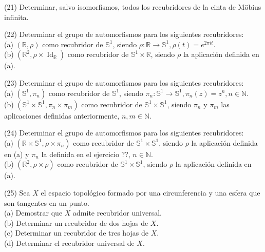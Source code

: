\documentclass[
  a4paper,
  spanish,
  12pt,
]{scrartcl}
\begin{document}
\begin{ejer}
(21) Determinar, salvo isomorfismos, todos los recubridores de la cinta de Möbius infinita.\\
\end{ejer}

\begin{ejer}
(22) Determinar el grupo de automorfismos para los siguientes recubridores:\\
(a) $(\mathbb{R}, \rho)$ como recubridor de $\mathbb{S}^{1}$, siendo $\rho: \mathbb{R} \rightarrow \mathbb{S}^{1}, \rho(t)=e^{2 \pi i t}$.\\
(b) $\left(\mathbb{R}^{2}, \rho \times \operatorname{Id}_{\mathbb{R}}\right)$ como recubridor de $\mathbb{S}^{1} \times \mathbb{R}$, siendo $\rho$ la aplicación definida en (a).\\
\end{ejer}

\begin{ejer}
(23) Determinar el grupo de automorfismos para los siguientes recubridores:\\
(a) $\left(\mathbb{S}^{1}, \pi_{n}\right)$ como recubridor de $\mathbb{S}^{1}$, siendo $\pi_{n}: \mathbb{S}^{1} \rightarrow \mathbb{S}^{1}, \pi_{n}(z)=z^{n}, n \in \mathbb{N}$.\\
(b) $\left(\mathbb{S}^{1} \times \mathbb{S}^{1}, \pi_{n} \times \pi_{m}\right)$ como recubridor de $\mathbb{S}^{1} \times \mathbb{S}^{1}$, siendo $\pi_{n}$ y $\pi_{m}$ las aplicaciones definidas anteriormente, $n, m \in \mathbb{N}$.\\
\end{ejer}

\begin{ejer}
(24) Determinar el grupo de automorfismos para los siguientes recubridores:\\
(a) $\left(\mathbb{R} \times \mathbb{S}^{1}, \rho \times \pi_{n}\right)$ como recubridor de $\mathbb{S}^{1} \times \mathbb{S}^{1}$, siendo $\rho$ la aplicación definida en (a) y $\pi_{n}$ la definida en el ejercicio ??, $n \in \mathbb{N}$.\\
(b) $\left(\mathbb{R}^{2}, \rho \times \rho\right)$ como recubridor de $\mathbb{S}^{1} \times \mathbb{S}^{1}$, siendo $\rho$ la aplicación definida en (a).\\
\end{ejer}

\begin{ejer}
(25) Sea $X$ el espacio topológico formado por una circunferencia y una esfera que son tangentes en un punto.\\
(a) Demostrar que $X$ admite recubridor universal.\\
(b) Determinar un recubridor de dos hojas de $X$.\\
(c) Determinar un recubridor de tres hojas de $X$.\\
(d) Determinar el recubridor universal de $X$.
\end{ejer}
\end{document}
